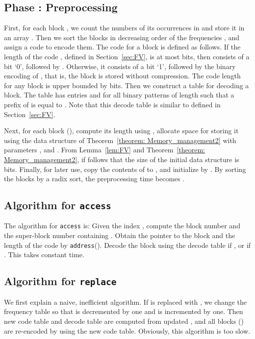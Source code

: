 \documentclass{llncs}
\begin{document}
\subsection{Phase : Preprocessing}

First, for each block ,
we count the numbers of its occurrences in 
and store it in an array .
Then we sort the blocks  in decreasing order of
the frequencies , and assign a code  to encode them.
The code for a block  is defined as follows.
If the length of the code , defined in Section~\ref{sec:FV},
is at most  bits, then  consists of a bit `0',
followed by .  Otherwise, it consists of a bit `1',
followed by the binary encoding of , that is, the block is stored without
compression.
The code length for any block  is upper bounded 
by  bits.
Then we construct a table  for decoding a block.
The table has  entries
and  for all binary patterns  of length 
such that a prefix of  is equal to .  Note that this decode table
is similar to  defined in Section~\ref{sec:FV}.

Next, for each block  (), 
compute its length using ,
allocate space for storing it using the data structure of Theorem~\ref{theorem: Memory_management2}
with parameters 
,
and .
From Lemma~\ref{lem:FV} and Theorem~\ref{theorem: Memory_management2},
if follows that
the size of the initial data structure is 
bits.
Finally, for later use, copy the contents of  to ,
and initialize  by .
By sorting the blocks by a radix sort, the preprocessing time becomes
.


\subsection{Algorithm for \texttt{access}}
The algorithm for \texttt{access} is:
Given the index ,
compute the block number 
and the super-block number  containing .
Obtain the pointer to the block and the length of the code
by \texttt{address}().
Decode the block using the decode table  if ,
or  if .
This takes constant time.


\subsection{Algorithm for \texttt{replace}}
We first explain a naive, inefficient algorithm.
If  is replaced with , we change the frequency
table  
so that  is decremented by one and  is
incremented by one.  Then new code table  and decode table 
are computed from updated ,
and all blocks  () are re-encoded by 
using the new code table.
Obviously, this algorithm is too slow.
\end{document}
